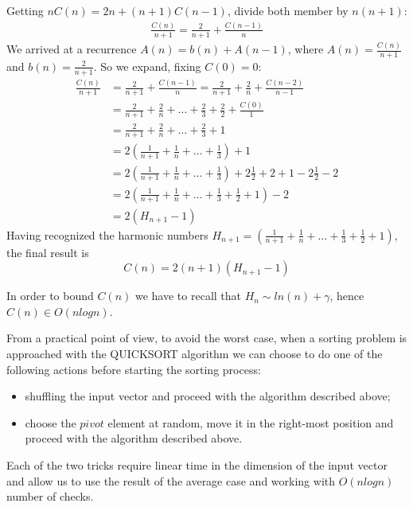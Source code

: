 Getting $nC(n) = 2n + (n+1)C(n-1)$, divide both member by $n(n+1)$:
\begin{displaymath}
  \begin{split}
    \frac{C(n)}{n+1}  = \frac{2}{n+1} +
    \frac{C(n-1)}{n}
  \end{split}
\end{displaymath}
We arrived at a recurrence $A(n) = b(n) + A(n-1)$, where $A(n) =
\frac{C(n)}{n+1} $ and $b(n) = \frac{2}{n+1} $. So we expand, fixing
$C(0) = 0$:
\begin{displaymath}
  \begin{split}
    \frac{C(n)}{n+1} &= \frac{2}{n+1} + \frac{C(n-1)}{n} =
    \frac{2}{n+1} +
    \frac{2}{n} + \frac{C(n-2)}{n-1}\\
    &= \frac{2}{n+1} + \frac{2}{n} + \ldots +
    \frac{2}{3} + \frac{2}{2} + \frac{C(0)}{1}\\
    &= \frac{2}{n+1} + \frac{2}{n} + \ldots +
    \frac{2}{3} + 1\\
    &= 2\left(\frac{1}{n+1} + \frac{1}{n} + \ldots +
      \frac{1}{3}\right) + 1\\
    &= 2\left(\frac{1}{n+1} + \frac{1}{n} + \ldots +
      \frac{1}{3}\right) +2\frac{1}{2} + 2
    + 1 -2\frac{1}{2} - 2\\
    &= 2\left(\frac{1}{n+1} + \frac{1}{n} + \ldots +
      \frac{1}{3}+
      \frac{1}{2}+
      1\right) -2 \\
    &= 2(H_{n+1}-1) 
  \end{split}
\end{displaymath}
Having recognized the harmonic numbers $H_{n+1}=\left(\frac{1}{n+1} +
  \frac{1}{n} + \ldots + \frac{1}{3}+ \frac{1}{2}+ 1\right)$, the
final result is $$C(n) = 2(n+1)(H_{n+1}-1)$$

In order to bound $C(n)$ we have to recall that $H_n \sim ln(n) +
\gamma$, hence $C(n) \in O(nlogn)$.

From a practical point of view, to avoid the worst case, when a
sorting problem is approached with the QUICKSORT algorithm we can
choose to do one of the following actions before starting the sorting
process:
\begin{itemize}
\item shuffling the input vector and proceed with the algorithm
  described above;
\item choose the $pivot$ element at random, move it in the right-most
  position and proceed with the algorithm described above.
\end{itemize}
Each of the two tricks require linear time in the dimension of the
input vector and allow us to use the result of the average case and
working with $O(nlogn)$ number of checks.

